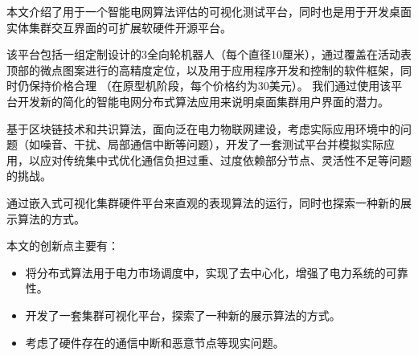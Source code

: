\begin{cabstract}

  本文介绍了用于一个智能电网算法评估的可视化测试平台，同时也是用于开发桌面实体集群交互界面的可扩展软硬件开源平台。

  该平台包括一组定制设计的3全向轮机器人（每个直径10厘米），通过覆盖在活动表顶部的微点图案进行的高精度定位，以及用于应用程序开发和控制的软件框架，同时仍保持价格合理 （在原型机阶段，每个价格约为30美元）。 我们通过使用该平台开发新的简化的智能电网分布式算法应用来说明桌面集群用户界面的潜力。

  基于区块链技术和共识算法，面向泛在电力物联网建设，考虑实际应用环境中的问题（如噪音、干扰、局部通信中断等问题），开发了一套测试平台并模拟实际应用，以应对传统集中式优化通信负担过重、过度依赖部分节点、灵活性不足等问题的挑战。

  通过嵌入式可视化集群硬件平台来直观的表现算法的运行，同时也探索一种新的展示算法的方式。

  本文的创新点主要有：

  \begin{itemize}
    \item 将分布式算法用于电力市场调度中，实现了去中心化，增强了电力系统的可靠性。
    \item 开发了一套集群可视化平台，探索了一种新的展示算法的方式。
    \item 考虑了硬件存在的通信中断和恶意节点等现实问题。
  \end{itemize}


\end{cabstract}


